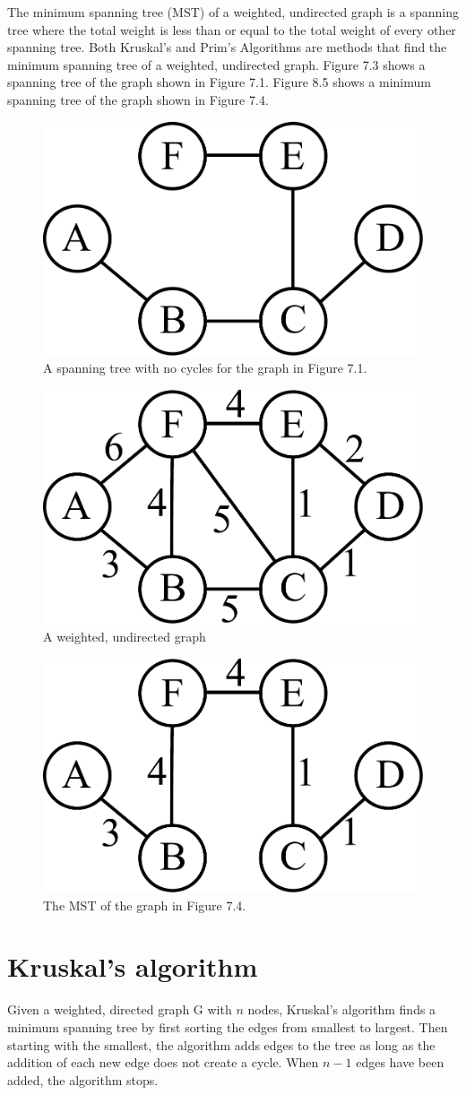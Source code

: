 The minimum spanning tree (MST) of a weighted, undirected graph is a spanning tree where the total weight is less than or equal to the total weight of every other spanning tree.
Both Kruskal's and Prim's Algorithms are methods that find the minimum spanning tree of a weighted, undirected graph.
Figure 7.3 shows a spanning tree of the graph shown in Figure 7.1.
Figure 8.5 shows a minimum spanning tree of the graph shown in Figure 7.4.

\begin{figure}[H]
\includegraphics[width = .4\textwidth]{graph2.pdf}
\caption{A spanning tree with no cycles for the graph in Figure 7.1.}
\label{mst:graph2}
\end{figure}

\begin{figure}[H]
\includegraphics[width = .4\textwidth]{graph4.pdf}
\caption{A weighted, undirected graph}
\label{mst:graph4}
\end{figure}

\begin{figure}[H]
\includegraphics[width = .4\textwidth]{graph5.pdf}
\caption{The MST of the graph in Figure 7.4.}
\end{figure}

\section*{Kruskal's algorithm}

Given a weighted, directed graph G with $n$ nodes, Kruskal's algorithm finds a minimum spanning tree by first sorting the edges from smallest to largest.
Then starting with the smallest, the algorithm adds edges to the tree as long as the addition of each new edge does not create a cycle.
When $n-1$ edges have been added, the algorithm stops.

